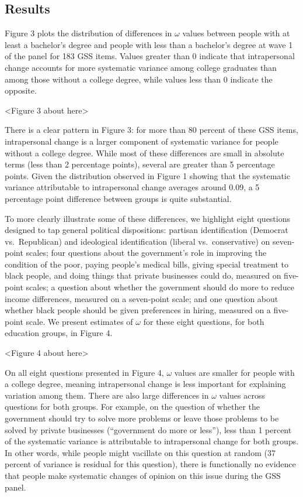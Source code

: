 \documentclass[
  12pt,
]{article}
\begin{document}
\hypertarget{results-1}{%
\subsection{Results}\label{results-1}}

Figure 3 plots the distribution of differences in \(\omega\) values
between people with at least a bachelor's degree and people with less
than a bachelor's degree at wave 1 of the panel for 183 GSS items.
Values greater than 0 indicate that intrapersonal change accounts for
more systematic variance among college graduates than among those
without a college degree, while values less than 0 indicate the
opposite.

\begin{center}
<Figure 3 about here>
\end{center}

There is a clear pattern in Figure 3: for more than 80 percent of these
GSS items, intrapersonal change is a larger component of systematic
variance for people without a college degree. While most of these
differences are small in absolute terms (less than 2 percentage points),
several are greater than 5 percentage points. Given the distribution
observed in Figure 1 showing that the systematic variance attributable
to intrapersonal change averages around 0.09, a 5 percentage point
difference between groups is quite substantial.

To more clearly illustrate some of these differences, we highlight eight
questions designed to tap general political dispositions: partisan
identification (Democrat vs.~Republican) and ideological identification
(liberal vs.~conservative) on seven-point scales; four questions about
the government's role in improving the condition of the poor, paying
people's medical bills, giving special treatment to black people, and
doing things that private businesses could do, measured on five-point
scales; a question about whether the government should do more to reduce
income differences, measured on a seven-point scale; and one question
about whether black people should be given preferences in hiring,
measured on a five-point scale. We present estimates of \(\omega\) for
these eight questions, for both education groups, in Figure 4.

\begin{center}
<Figure 4 about here>
\end{center}

On all eight questions presented in Figure 4, \(\omega\) values are
smaller for people with a college degree, meaning intrapersonal change
is less important for explaining variation among them. There are also
large differences in \(\omega\) values across questions for both groups.
For example, on the question of whether the government should try to
solve more problems or leave those problems to be solved by private
businesses (``government do more or less''), less than 1 percent of the
systematic variance is attributable to intrapersonal change for both
groups. In other words, while people might vacillate on this question at
random (37 percent of variance is residual for this question), there is
functionally no evidence that people make systematic changes of opinion
on this issue during the GSS panel.
\end{document}
